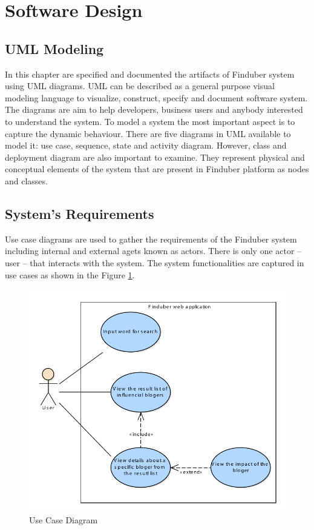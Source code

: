 \section{Software Design}

\setcounter{page}{30}

\subsection{UML Modeling}

In this chapter are specified and documented the artifacts of Finduber system using UML diagrams. UML can be described as a general purpose visual modeling language to visualize, construct, specify and document software system. The diagrams are aim to help developers, business users and anybody interested to understand the system. To model a system the most important aspect is to capture the dynamic behaviour. There are five diagrams in UML available to model it: use case, sequence, state and activity diagram. However, class and deployment diagram are also important to examine. They represent physical and conceptual elements of the system that are present in Finduber platform as nodes and classes.

\subsection{System's Requirements}

Use case diagrams are used to gather the requirements of the Finduber system including internal and external agets known as actors. There is only one actor -- user -- that interacts with the system. The system functionalities are captured in use cases as shown in the Figure \ref{usecase_uml}.

\begin{figure}[!ht]
\centering
\includegraphics[width=15cm]{UseCase.pdf}
\caption{Use Case Diagram}\label{usecase_uml}
\end{figure}


